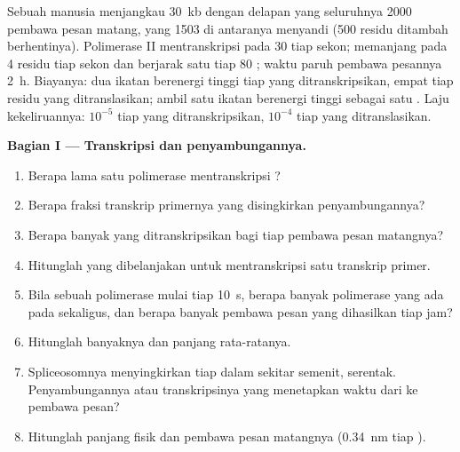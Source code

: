 \begin{problem}
\label{pb:b1:gene-expression:1}
Sebuah  manusia menjangkau \qty{30}{kb} dengan delapan  yang
seluruhnya \qty{2000}{}  pembawa pesan matang, yang
\qty{1503}{} di antaranya menyandi (500 residu ditambah 
berhentinya). Polimerase II mentranskripsi pada \qty{30}{} 
tiap sekon;  memanjang pada \qty{4}{} residu tiap sekon dan
berjarak satu tiap \qty{80}{} ; waktu paruh pembawa pesannya
\qty{2}{h}. Biayanya: dua ikatan berenergi tinggi tiap  yang
ditranskripsikan, empat tiap residu yang ditranslasikan; ambil satu
ikatan berenergi tinggi sebagai satu . Laju kekeliruannya:
$10^{-5}$ tiap  yang ditranskripsikan, $10^{-4}$ tiap 
yang ditranslasikan.

\medskip
\noindent\textbf{Bagian I --- Transkripsi dan penyambungannya.}
\begin{enumerate}
  \item Berapa lama satu polimerase mentranskripsi ?
  \item Berapa fraksi transkrip primernya yang disingkirkan
        penyambungannya?
  \item Berapa banyak  yang ditranskripsikan bagi tiap
         pembawa pesan matangnya?
  \item Hitunglah  yang dibelanjakan untuk mentranskripsi satu
        transkrip primer.
  \item Bila sebuah polimerase mulai tiap \qty{10}{s}, berapa banyak
        polimerase yang ada pada  sekaligus, dan berapa banyak
        pembawa pesan yang dihasilkan  tiap jam?
  \item Hitunglah banyaknya  dan panjang rata-ratanya.
  \item Spliceosomnya menyingkirkan tiap  dalam sekitar semenit,
        serentak. Penyambungannya atau transkripsinya yang menetapkan
        waktu dari  ke pembawa pesan?
  \item Hitunglah panjang fisik  dan pembawa pesan matangnya
        (\qty{0.34}{nm} tiap ).
\end{enumerate}


\end{problem}
